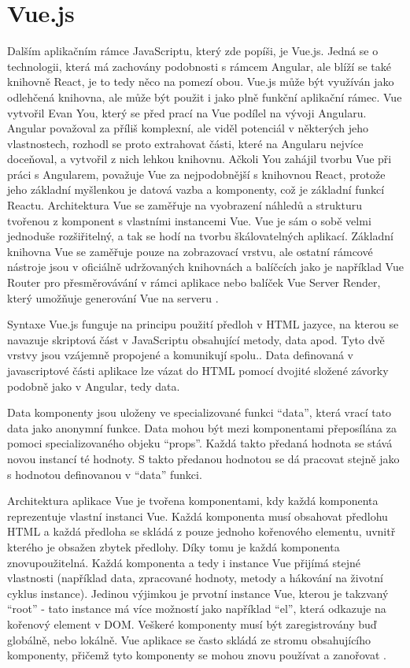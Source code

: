     \section{Vue.js}
Dalším aplikačním rámce JavaScriptu, který zde popíši, je Vue.js. Jedná se o technologii, která má zachovány podobnosti s rámcem Angular, ale blíží se také knihovně React, je to tedy něco na pomezí obou. Vue.js může být využíván jako odlehčená knihovna, ale může být použit i jako plně funkční aplikační rámec. Vue vytvořil Evan You, který se před prací na Vue podílel na vývoji Angularu. Angular považoval za příliš komplexní, ale viděl potenciál v některých jeho vlastnostech, rozhodl se proto extrahovat části, které na Angularu nejvíce doceňoval, a vytvořil z nich lehkou knihovnu. Ačkoli You zahájil tvorbu Vue při práci s Angularem, považuje Vue za nejpodobnější s knihovnou React, protože jeho základní myšlenkou je datová vazba a komponenty, což je základní funkcí Reactu. Architektura Vue se zaměřuje na vyobrazení náhledů a strukturu tvořenou z komponent s vlastními instancemi Vue. Vue je sám o sobě velmi jednoduše rozšiřitelný, a tak se hodí na tvorbu škálovatelných aplikací. Základní knihovna Vue se zaměřuje pouze na zobrazovací vrstvu, ale ostatní rámcové nástroje jsou v oficiálně udržovaných knihovnách a balíčcích jako je například Vue Router pro přesměrovávání v rámci aplikace nebo balíček Vue Server Render, který umožňuje generování Vue na serveru \cite{vuejsup}. 

Syntaxe Vue.js funguje na principu použití předloh v HTML jazyce, na kterou se navazuje skriptová část v JavaScriptu obsahující metody, data apod. Tyto dvě vrstvy jsou vzájemně propojené a komunikují spolu.. Data definovaná v javascriptové části aplikace lze vázat do HTML pomocí dvojité složené závorky podobně jako v Angular, tedy {{data}}.

Data komponenty jsou uloženy ve specializované funkci “data”, která vrací tato data jako anonymní funkce. Data mohou být mezi komponentami přeposílána za pomoci specializovaného objeku “props”. Každá takto předaná hodnota se stává novou instancí té hodnoty. S takto předanou hodnotou se dá pracovat stejně jako s hodnotou definovanou v “data” funkci.

Architektura aplikace Vue je tvořena komponentami, kdy každá komponenta reprezentuje vlastní instanci Vue. Každá komponenta musí obsahovat předlohu HTML a každá předloha se skládá z pouze jednoho kořenového elementu, uvnitř kterého je obsažen zbytek předlohy. Díky tomu je každá komponenta znovupoužitelná. Každá komponenta a tedy i instance Vue přijímá stejné vlastnosti (například data, zpracované hodnoty, metody a hákování na životní cyklus instance). Jedinou výjimkou je prvotní instance Vue, kterou je takzvaný “root” - tato instance má více možností jako například “el”, která odkazuje na kořenový element v DOM. Veškeré komponenty musí být zaregistrovány buď globálně, nebo lokálně. Vue aplikace se často skládá ze stromu obsahujícího komponenty, přičemž tyto komponenty se mohou znovu používat a zanořovat \cite{vuejsup}.

